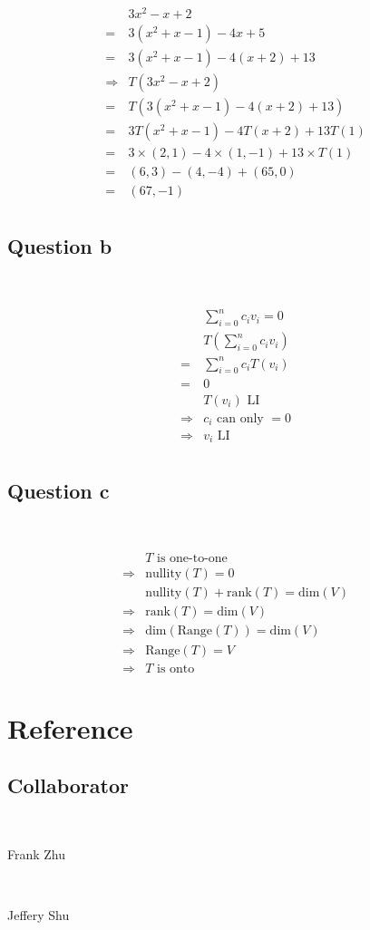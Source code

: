 \documentclass{article}
\begin{document}
~

\begin{equation}
\tag{5.1}
\begin{split}
&3x^2-x+2\\
=&3(x^2+x-1)-4x+5\\
=&3(x^2+x-1)-4(x+2)+13\\
\Rightarrow & T(3x^2-x+2)\\
=&T(3(x^2+x-1)-4(x+2)+13)\\
=&3T(x^2+x-1)-4T(x+2)+13T(1)\\
=&3\times (2,1)-4\times (1,-1)+13\times T(1)\\
=& (6,3)-(4,-4)+(65,0)\\
=&(67,-1)\\
\end{split}
\end{equation}

\subsection{Question b}

~

\begin{equation}
\tag{5.2}
\begin{split}
&\sum_{i=0}^{n}c_iv_i=0\\
&T(\sum_{i=0}^{n}c_iv_i)\\
=&\sum_{i=0}^{n}c_iT(v_i)\\
=&0\\
&T(v_i) \text{ LI}\\
\Rightarrow &c_i\text{ can only }=0\\
\Rightarrow &v_i \text{ LI}\\
\end{split}
\end{equation}

\subsection{Question c}

~

\begin{equation}
\tag{5.3}
\begin{split}
&T \text{ is one-to-one}\\
\Rightarrow &\text{nullity}(T)=0\\
&\text{nullity}(T)+\text{rank}(T)=\text{dim}(V)\\
\Rightarrow &\text{rank}(T)=\text{dim}(V)\\
\Rightarrow &\text{dim}(\text{Range}(T))=\text{dim}(V)\\
\Rightarrow &\text{Range}(T)=V\\
\Rightarrow &T\text{ is onto}
\end{split}
\end{equation}

\newpage

\section{Reference}

\subsection{Collaborator}

~

Frank Zhu

~

Jeffery Shu
\end{document}
